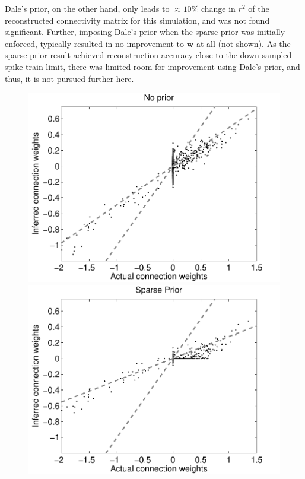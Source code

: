 \documentclass[aoas,preprint]{imsart}
\newcommand{\w}{w}
\newcommand{\bw}{\mathbf{\w}}
\begin{document}
Dale's prior, on the other hand, only leads to $\approx 10\%$ change in $r^2$ of the reconstructed connectivity matrix for this simulation, and was not found significant. Further, imposing Dale's prior when the sparse prior was initially enforced, typically resulted in no improvement to $\bw$ at all (not shown).  As the sparse prior result achieved reconstruction accuracy close to the down-sampled spike train limit, there was limited room for improvement using Dale's prior, and thus, it is not pursued further here.

\begin{figure}[h]
\centering
\begin{minipage}[c]{0.45\hsize}
\includegraphics[width=\hsize]{../figs/FigureA10_regular_sol}
\end{minipage}
\begin{minipage}[c]{0.45\hsize}
\includegraphics[width=\hsize]{../figs/FigureA10_sparse_sol}

\end{minipage}
\end{figure}
\end{document}
